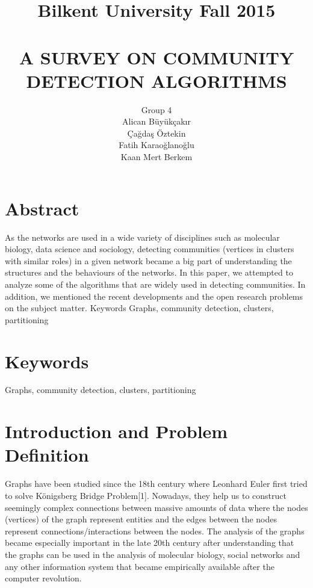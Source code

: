 \documentclass[10pt]{article}
\title{Bilkent University Fall 2015 \\ ~\\
A SURVEY ON COMMUNITY DETECTION ALGORITHMS}
\author{Group 4 \\
Alican Büyükçakır \\ Çağdaş Öztekin \\ 
Fatih Karaoğlanoğlu \\ 
Kaan Mert Berkem}
\date{\vspace{-5ex}}
\begin{document}
\maketitle



\section*{Abstract}

As the networks are used in a wide variety of disciplines such as molecular biology, data science and sociology, detecting communities (vertices in clusters with similar roles) in a given network became a big part of understanding the structures and the behaviours of the networks. In this paper, we attempted to analyze some of the algorithms that are widely used in detecting communities. In addition, we mentioned the recent developments and the open research problems on the subject matter.
Keywords
Graphs, community detection, clusters, partitioning

\section*{Keywords}

Graphs, community detection, clusters, partitioning

\newpage

\tableofcontents

\newpage

\section{Introduction and Problem Definition}

Graphs have been studied since the 18th century where Leonhard Euler first tried to solve Königsberg Bridge Problem[1]. Nowadays, they help us to construct seemingly complex connections between massive amounts of data where the nodes (vertices) of the graph represent entities and the edges between the nodes represent connections/interactions between the nodes. The analysis of the graphs became especially important in the late 20th century after understanding that the graphs can be used in the analysis of molecular biology, social networks and any other information system that became empirically available after the computer revolution.\\
\end{document}
